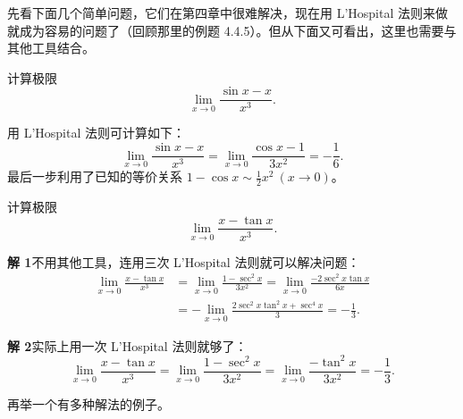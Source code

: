 先看下面几个简单问题，它们在第四章中很难解决，现在用 L'Hospital 法则来做就成为容易的问题了（回顾那里的例题 4.4.5）。但从下面又可看出，这里也需要与其他工具结合。

\begin{xexample}[8.1.1]
计算极限
\[
  \lim_{x\to0}\frac{\sin x-x}{x^3}.
\]
\end{xexample}
\begin{xsolution}
用 L'Hospital 法则可计算如下：
\[
  \lim_{x\to0}\frac{\sin x-x}{x^3}
  =\lim_{x\to0}\frac{\cos x-1}{3x^2}
  =-\frac16.
\]
最后一步利用了已知的等价关系 $1-\cos x\sim\frac12x^2\ (x\to0)$。
\end{xsolution}

\begin{xexample}[8.1.2]
计算极限
\[
  \lim_{x\to0}\frac{x-\tan x}{x^3}.
\]
\end{xexample}
\begin{xsolution}
\textbf{解 1}\quad 不用其他工具，连用三次 L'Hospital 法则就可以解决问题：
\begin{align*}
  \lim_{x\to0}\frac{x-\tan x}{x^3}
  &=\lim_{x\to0}\frac{1-\operatorname{sec}^2x}{3x^2}
   =\lim_{x\to0}\frac{-2\operatorname{sec}^2x\tan x}{6x}\\
  &=-\lim_{x\to0}\frac{2\operatorname{sec}^2x\tan^2x+\operatorname{sec}^4x}{3}
   =-\frac13.
\end{align*}

\textbf{解 2}\quad 实际上用一次 L'Hospital 法则就够了：
\[
  \lim_{x\to0}\frac{x-\tan x}{x^3}
  =\lim_{x\to0}\frac{1-\operatorname{sec}^2x}{3x^2}
  =\lim_{x\to0}\frac{-\tan^2x}{3x^2}
  =-\frac13.
\]
\end{xsolution}

再举一个有多种解法的例子。

